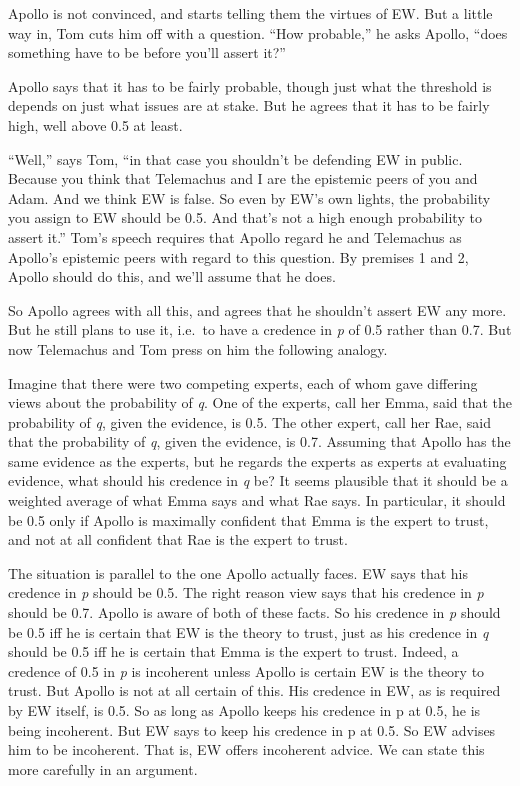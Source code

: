 \documentclass[
  11pt,
  letterpaper,
  DIV=11,
  numbers=noendperiod,
  twoside]{scrartcl}
\begin{document}
Apollo is not convinced, and starts telling them the virtues of EW. But
a little way in, Tom cuts him off with a question. ``How probable,'' he
asks Apollo, ``does something have to be before you'll assert it?''

Apollo says that it has to be fairly probable, though just what the
threshold is depends on just what issues are at stake. But he agrees
that it has to be fairly high, well above 0.5 at least.

``Well,'' says Tom, ``in that case you shouldn't be defending EW in
public. Because you think that Telemachus and I are the epistemic peers
of you and Adam. And we think EW is false. So even by EW's own lights,
the probability you assign to EW should be 0.5. And that's not a high
enough probability to assert it.'' Tom's speech requires that Apollo
regard he and Telemachus as Apollo's epistemic peers with regard to this
question. By premises 1 and 2, Apollo should do this, and we'll assume
that he does.

So Apollo agrees with all this, and agrees that he shouldn't assert EW
any more. But he still plans to use it, i.e.~to have a credence in
\emph{p} of 0.5 rather than 0.7. But now Telemachus and Tom press on him
the following analogy.

Imagine that there were two competing experts, each of whom gave
differing views about the probability of \emph{q}. One of the experts,
call her Emma, said that the probability of \emph{q}, given the
evidence, is 0.5. The other expert, call her Rae, said that the
probability of \emph{q}, given the evidence, is 0.7. Assuming that
Apollo has the same evidence as the experts, but he regards the experts
as experts at evaluating evidence, what should his credence in \emph{q}
be? It seems plausible that it should be a weighted average of what Emma
says and what Rae says. In particular, it should be 0.5 only if Apollo
is maximally confident that Emma is the expert to trust, and not at all
confident that Rae is the expert to trust.

The situation is parallel to the one Apollo actually faces. EW says that
his credence in \emph{p} should be 0.5. The right reason view says that
his credence in \emph{p} should be 0.7. Apollo is aware of both of these
facts. So his credence in \emph{p} should be 0.5 iff he is certain that
EW is the theory to trust, just as his credence in \emph{q} should be
0.5 iff he is certain that Emma is the expert to trust. Indeed, a
credence of 0.5 in \emph{p} is incoherent unless Apollo is certain EW is
the theory to trust. But Apollo is not at all certain of this. His
credence in EW, as is required by EW itself, is 0.5. So as long as
Apollo keeps his credence in p at 0.5, he is being incoherent. But EW
says to keep his credence in p at 0.5. So EW advises him to be
incoherent. That is, EW offers incoherent advice. We can state this more
carefully in an argument.
\end{document}
